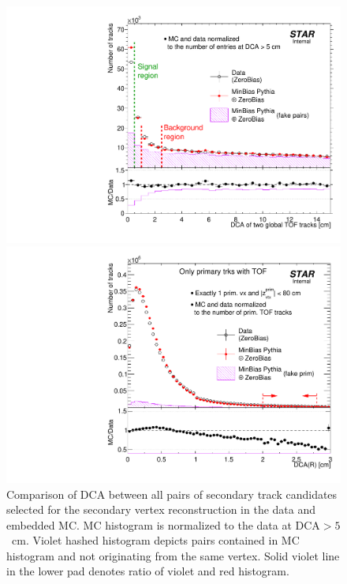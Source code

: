 \begin{figure}[t!]\vspace{-2pt}%
\centering%
\begin{minipage}{.4725\textwidth}%
  \centering%
  \includegraphics[width=\linewidth]{graphics/deadMaterial/DcaOfTwoGlobalTofTrksWithLargeD0_DataVsMC.pdf}\vspace{-5pt}%
  \caption[Comparison of DCA between all pairs of secondary track candidates selected for the secondary vertex reconstruction in the data and embedded MC.]%
  {Comparison of DCA between all pairs of secondary track candidates selected for the secondary vertex reconstruction  in the data and embedded MC. MC histogram is normalized to the data at $\text{DCA}>5$~cm. Violet hashed histogram depicts pairs contained in MC histogram and not originating from the same vertex. Solid violet line in the lower pad denotes ratio of violet and red histogram.\newline\newline }\label{fig:DcaOfTwoGlobalTofTrksWithLargeD0_DataVsMC}
\end{minipage}%
\quad\quad%
\begin{minipage}{.4725\textwidth}%
  \centering%
  \includegraphics[width=\linewidth]{graphics/deadMaterial/DcaRPrimary_Tof_SelectedEvents_DataVsMC.pdf}\vspace*{-5pt}

\end{minipage}
\end{figure}
